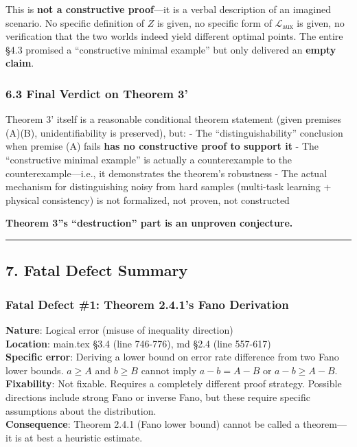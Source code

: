 \documentclass[
  12pt,
]{article}
\begin{document}
This is \textbf{not a constructive proof}---it is a verbal description of an imagined scenario. No specific definition of \(Z\) is given, no specific form of \(\mathcal{L}_{\text{aux}}\) is given, no verification that the two worlds indeed yield different optimal points. The entire \S4.3 promised a ``constructive minimal example'' but only delivered an \textbf{empty claim}.

\subsubsection{6.3 Final Verdict on Theorem 3'}\label{final-verdict-theorem-3}

Theorem 3' itself is a reasonable conditional theorem statement (given premises (A)(B), unidentifiability is preserved), but:
- The ``distinguishability'' conclusion when premise (A) fails \textbf{has no constructive proof to support it}
- The ``constructive minimal example'' is actually a counterexample to the counterexample---i.e., it demonstrates the theorem's robustness
- The actual mechanism for distinguishing noisy from hard samples (multi-task learning + physical consistency) is not formalized, not proven, not constructed

\textbf{Theorem 3''s ``destruction'' part is an unproven conjecture.}

\begin{center}\rule{0.5\linewidth}{0.5pt}\end{center}

\subsection{7. Fatal Defect Summary}\label{fatal-defect-summary}

\subsubsection{Fatal Defect \#1: Theorem 2.4.1's Fano Derivation}\label{fatal-1}

\textbf{Nature}: Logical error (misuse of inequality direction)\\
\textbf{Location}: main.tex \S3.4 (line 746-776), md \S2.4 (line 557-617)\\
\textbf{Specific error}: Deriving a lower bound on error rate difference from two Fano lower bounds. \(a \geq A\) and \(b \geq B\) cannot imply \(a-b = A-B\) or \(a-b \geq A-B\).\\
\textbf{Fixability}: Not fixable. Requires a completely different proof strategy. Possible directions include strong Fano or inverse Fano, but these require specific assumptions about the distribution.\\
\textbf{Consequence}: Theorem 2.4.1 (Fano lower bound) cannot be called a theorem---it is at best a heuristic estimate.
\end{document}
